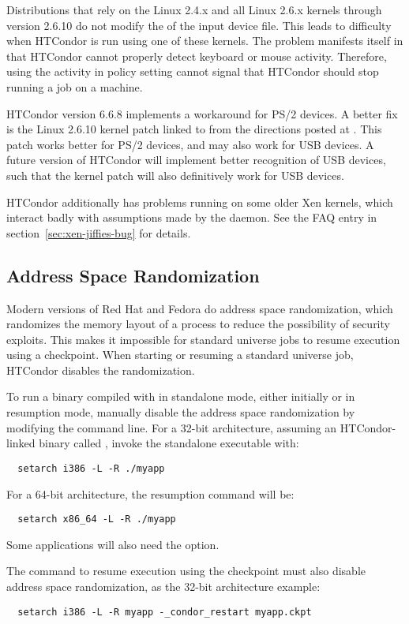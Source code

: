 Distributions that rely on the Linux 2.4.x and all Linux 2.6.x kernels
through version 2.6.10
do not modify the  of the input device file.
This leads to difficulty when HTCondor is run using one of these
kernels. 
The problem manifests itself in that HTCondor cannot properly
detect keyboard or mouse activity.
Therefore, using the activity in policy setting cannot
signal that HTCondor should stop running a job on a machine.

HTCondor version 6.6.8 implements a workaround for PS/2 devices.
A better fix is the Linux 2.6.10 kernel
patch linked to from the directions posted at
.
This patch works better for PS/2 devices, and
may also work for USB devices.
A future version of HTCondor will implement better recognition
of USB devices,
such that the kernel patch will also definitively work for USB devices.

HTCondor additionally has problems running on some older Xen kernels,
which interact badly with assumptions made by the 
daemon. See the FAQ entry in section~\ref{sec:xen-jiffies-bug} for
details.

\subsection{\label{sec:platform-linux-addrspace-random}Address Space Randomization}

Modern versions of Red Hat and Fedora do address space randomization,
which randomizes the memory layout of a process
to reduce the possibility of security exploits. 
This makes it impossible
for standard universe jobs to resume execution using a checkpoint.
When starting or resuming a standard universe job,
HTCondor disables the randomization.

To run a binary compiled with   in standalone mode,
either initially or in resumption mode,
manually disable the address space randomization by modifying the
command line.
For a 32-bit architecture, assuming an
HTCondor-linked binary called ,
invoke the standalone executable with:
\begin{verbatim}
  setarch i386 -L -R ./myapp
\end{verbatim}
For a 64-bit architecture, the resumption command will be: 
\begin{verbatim}
  setarch x86_64 -L -R ./myapp
\end{verbatim}
Some applications will also need the  option.

The command to resume execution using the checkpoint must also
disable address space randomization, 
as the 32-bit architecture example:
\begin{verbatim}
  setarch i386 -L -R myapp -_condor_restart myapp.ckpt
\end{verbatim}


